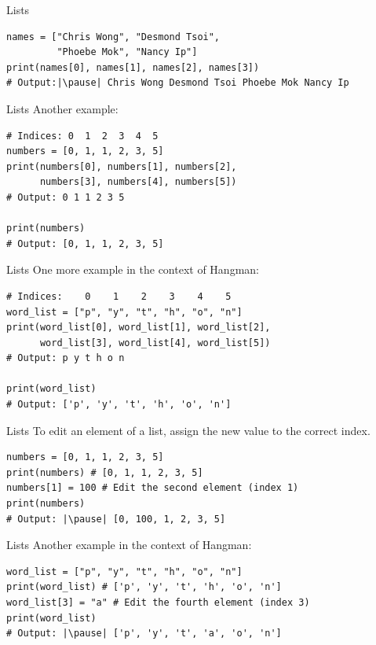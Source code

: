 \documentclass[dvipsnames, svgnames, x11names, handout]{beamer}
\begin{document}
\begin{frame}[fragile]{Lists}
\begin{verbatim}
names = ["Chris Wong", "Desmond Tsoi",
         "Phoebe Mok", "Nancy Ip"]
print(names[0], names[1], names[2], names[3]) 
# Output:|\pause| Chris Wong Desmond Tsoi Phoebe Mok Nancy Ip
\end{verbatim}
\end{frame}

\begin{frame}[fragile]{Lists}
Another example:
\begin{verbatim}
# Indices: 0  1  2  3  4  5
numbers = [0, 1, 1, 2, 3, 5]
print(numbers[0], numbers[1], numbers[2],
      numbers[3], numbers[4], numbers[5]) 
# Output: 0 1 1 2 3 5

print(numbers)
# Output: [0, 1, 1, 2, 3, 5]
\end{verbatim}
\end{frame}

\begin{frame}[fragile]{Lists}
One more example in the context of Hangman:
\begin{verbatim}
# Indices:    0    1    2    3    4    5
word_list = ["p", "y", "t", "h", "o", "n"]
print(word_list[0], word_list[1], word_list[2],
      word_list[3], word_list[4], word_list[5]) 
# Output: p y t h o n

print(word_list)
# Output: ['p', 'y', 't', 'h', 'o', 'n']
\end{verbatim}
\end{frame}

\begin{frame}[fragile]{Lists}
To edit an element of a list, assign the new value to the correct index. \pause
\begin{verbatim}
numbers = [0, 1, 1, 2, 3, 5]
print(numbers) # [0, 1, 1, 2, 3, 5]
numbers[1] = 100 # Edit the second element (index 1)
print(numbers)  
# Output: |\pause| [0, 100, 1, 2, 3, 5]
\end{verbatim}
\end{frame}

\begin{frame}[fragile]{Lists}
Another example in the context of Hangman:
\begin{verbatim}
word_list = ["p", "y", "t", "h", "o", "n"]
print(word_list) # ['p', 'y', 't', 'h', 'o', 'n']
word_list[3] = "a" # Edit the fourth element (index 3)
print(word_list)  
# Output: |\pause| ['p', 'y', 't', 'a', 'o', 'n']
\end{verbatim}
\end{frame}
\end{document}
